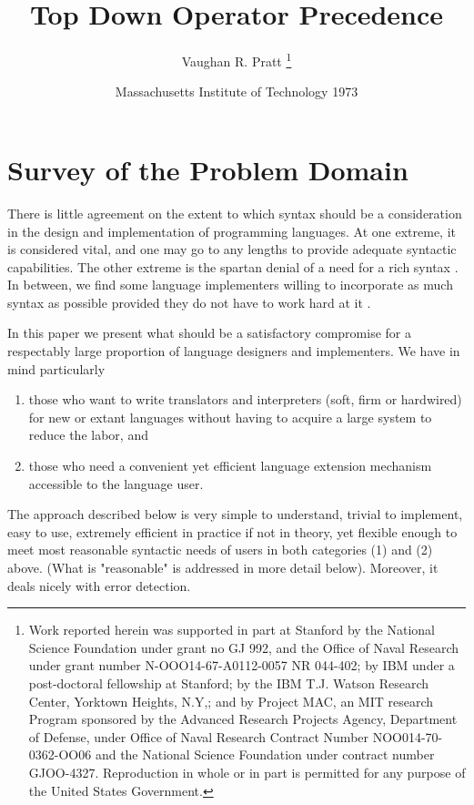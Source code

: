 \documentclass{article}
\title{Top Down Operator Precedence}
\author{Vaughan R. Pratt \thanks{Work reported herein was supported in part at
    Stanford by the National Science Foundation under grant no GJ 992, and the
    Office of Naval Research under grant number N-OOO14-67-A0112-0057 NR
    044-402; by IBM under a post-doctoral fellowship at Stanford; by the IBM
    T.J.  Watson Research Center, Yorktown Heights, N.Y,; and by Project MAC, an
    MIT research Program sponsored by the Advanced Research Projects Agency,
    Department of Defense, under Office of Naval Research Contract Number
    NOO014-70-0362-OO06 and the National Science Foundation under contract
    number GJOO-4327. Reproduction in whole or in part is permitted for any
    purpose of the United States Government.}}
\date{Massachusetts Institute of Technology 1973}
\begin{document}
\maketitle
\section{Survey of the Problem Domain}

There is little agreement on the extent to which syntax should be a
consideration in the design and implementation of programming languages. At one
extreme, it is considered vital, and one may go to any lengths
\cite{10.5555/1098667, mckeeman1970} to provide adequate syntactic
capabilities. The other extreme is the spartan denial of a need for a rich
syntax \cite{10.1145/321574.321575}. In between, we find some language
implementers willing to incorporate as much syntax as possible provided they do
not have to work hard at it \cite{10.1007/BF00264291}.

\par

In this paper we present what should be a satisfactory compromise for a
respectably large proportion of language designers and implementers. We have in
mind particularly

\begin{enumerate}
  \item those who want to write translators and interpreters (soft, firm or
    hardwired) for new or extant languages without having to acquire a large
    system to reduce the labor, and
  \item those who need a convenient yet efficient language extension mechanism
    accessible to the language user.
\end{enumerate}

\par

The approach described below is very simple to understand, trivial to implement,
easy to use, extremely efficient in practice if not in theory, yet flexible
enough to meet most reasonable syntactic needs of users in both categories (1)
and (2) above. (What is "reasonable" is addressed in more detail
below). Moreover, it deals nicely with error detection.

\par




\end{document}
